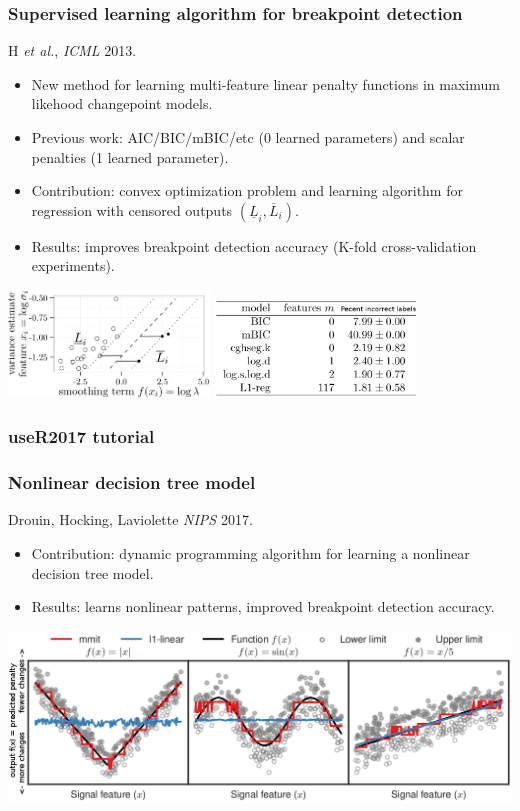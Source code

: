 \documentclass{beamer}
\begin{document}
\begin{frame}
  \frametitle{Supervised learning algorithm for breakpoint detection}
  H {\it et al.}, {\it ICML} 2013.
  \begin{itemize}
  \item New method for learning multi-feature linear penalty
    functions in maximum likehood changepoint models.
  \item Previous work: AIC/BIC/mBIC/etc (0 learned parameters)
    and scalar penalties (1 learned parameter).
  \item Contribution: convex optimization problem and learning
    algorithm for regression with censored outputs
    $(\underline L_i, \overline L_i)$.
  \item Results: improves breakpoint detection accuracy (K-fold
    cross-validation experiments).
  \end{itemize}
\includegraphics[width=0.4\textwidth]{screenshot-mmir-crop}
\includegraphics[width=0.4\textwidth]{screenshot-mmir-test-error}
\end{frame}

\begin{frame}
  \frametitle{useR2017 tutorial}
  
\end{frame}

\begin{frame}
  \frametitle{Nonlinear decision tree model}
  Drouin, Hocking, Laviolette {\it NIPS} 2017.
  \begin{itemize}
  \item Contribution: dynamic programming algorithm for learning a
    nonlinear decision tree model.
  \item Results: learns nonlinear patterns, improved
    breakpoint detection accuracy.
  \end{itemize}

\includegraphics[width=\textwidth]{screenshot-mmit-learned}
\end{frame}
\end{document}
